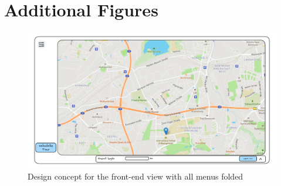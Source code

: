\chapter{Additional Figures}

%
%
%



\begin{figure}[H]
	\centering
	\includegraphics[width=0.9\linewidth]{bilder/Concept burger menu and stats hidden.png}
	\caption{Design concept for the front-end view with all menus folded}
	\label{fig:frontendConceptMenusClosed}
\end{figure}


